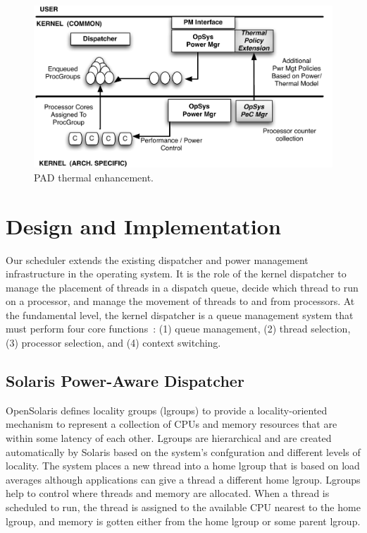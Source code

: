 \documentclass[times,10pt,onecolumn]{article}
\begin{document}
\begin{figure}[htbp]
  \centering
  \includegraphics[scale=0.40]{schedarch.pdf}
  \caption{PAD thermal enhancement.}
  \label{fig:schdarch}
\end{figure}

\section{Design and Implementation}
\label{sec:design}
Our scheduler extends the existing dispatcher and power
management infrastructure in the operating system. It is the role of the
kernel dispatcher to manage the placement of threads in a dispatch
queue, decide which thread to run on a processor, and manage the
movement of threads to and from processors.  At the fundamental level,
the kernel dispatcher is a queue management system that must perform
four core functions~\cite{McDougall2007}: (1) queue management, (2)
thread selection, (3) processor selection, and (4) context switching.

\subsection{Solaris Power-Aware Dispatcher}
\label{sec:solpad}
OpenSolaris defines locality groups (lgroups) to provide a
locality-oriented mechanism to represent a collection of CPUs and
memory resources that are within some latency of each other.
Lgroups are hierarchical and are created automatically by Solaris
based on the system’s confguration and different levels of
locality. The system places a new thread into a home lgroup that
is based on load averages although applications can give a thread
a different home lgroup. Lgroups help to control where threads
and memory are allocated.  When a thread is scheduled to run, the
thread is assigned to the available CPU nearest to the home
lgroup, and memory is gotten either from the home lgroup or some
parent lgroup.
\end{document}

